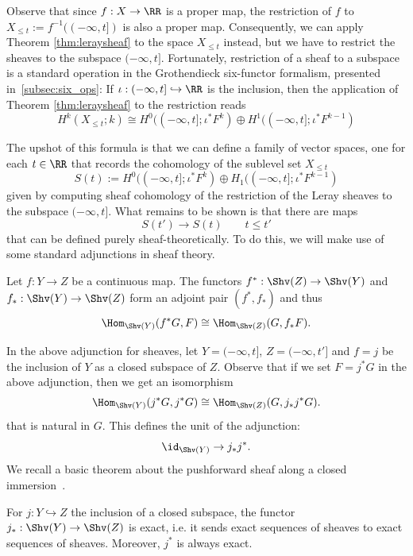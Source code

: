 Observe that since $f:X\to\RR$ is a proper map, the restriction of $f$ to $X_{\leq t}:=f^{-1}((-\infty,t])$ is also a proper map. Consequently, we can apply Theorem \ref{thm:leraysheaf} to the space $X_{\leq t}$ instead, but we have to restrict the sheaves to the subspace $(-\infty,t]$. Fortunately, restriction of a sheaf to a subspace is a standard operation in the Grothendieck six-functor formalism, presented in~\ref{subsec:six_ops}: If $\iota:(-\infty,t]\hookrightarrow \RR$ is the inclusion, then the application of Theorem \ref{thm:leraysheaf} to the restriction reads
\[
	H^k(X_{\leq t};k)\cong H^0((-\infty,t];\iota^*F^k)\oplus H^1((-\infty,t];\iota^*F^{k-1})
\]

The upshot of this formula is that we can define a family of vector spaces, one for each $t\in\RR$ that records the cohomology of the sublevel set $X_{\leq t}$
\[
	S(t):=H^0((-\infty,t];\iota^*F^k)\oplus H_1((-\infty,t];\iota^*F^{k-1})
\]
given by computing sheaf cohomology of the restriction of the Leray sheaves to the subspace $(-\infty,t]$. What remains to be shown is that there are maps
\[
	S(t')\to S(t) \qquad t\leq t'
\]
that can be defined purely sheaf-theoretically. To do this, we will make use of some standard adjunctions in sheaf theory.

\begin{thm}
Let $f:Y\to Z$ be a continuous map. The functors $f^*:\Shv(Z)\to \Shv(Y)$ and $f_*:\Shv(Y)\to\Shv(Z)$ form an adjoint pair $(f^*,f_*)$ and thus
\[
\Hom_{\Shv(Y)}(f^*G,F)\cong \Hom_{\Shv(Z)}(G,f_*F).
\]
\end{thm}

In the above adjunction for sheaves, let $Y=(-\infty,t]$, $Z=(-\infty,t']$ and $f=j$ be the inclusion of $Y$ as a closed subspace of $Z$. Observe that if we set $F=j^*G$ in the above adjunction, then we get an isomorphism
\[
\Hom_{\Shv(Y)}(j^*G,j^*G)\cong \Hom_{\Shv(Z)}(G,j_*j^*G).
\]
that is natural in $G$. This defines the unit of the adjunction:
\[
\id_{\Shv(Y)}\to j_*j^*.
\]
We recall a basic theorem about the pushforward sheaf along a closed immersion~\cite[II.5 p. 102]{iversen}.

\begin{prop}
	For $j:Y\hookrightarrow Z$ the inclusion of a closed subspace, the functor $j_*:\Shv(Y)\to\Shv(Z)$ is exact, i.e. it sends exact sequences of sheaves to exact sequences of sheaves. Moreover, $j^*$ is always exact.
\end{prop}

